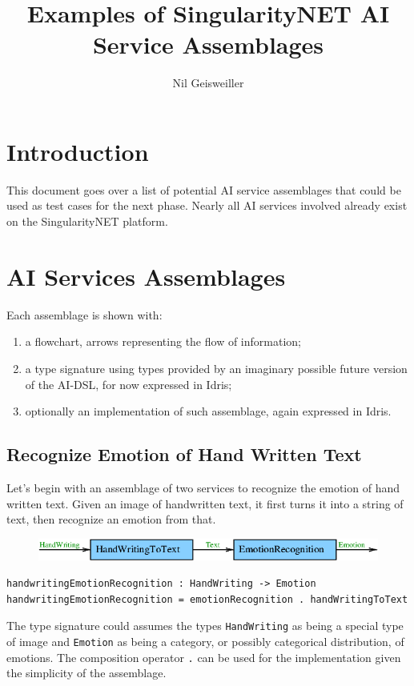 \documentclass[]{article}
\begin{document}
\title{Examples of SingularityNET AI Service Assemblages}
\author{Nil Geisweiller}
\maketitle

\section{Introduction}
This document goes over a list of potential AI service assemblages
that could be used as test cases for the next phase.  Nearly all AI
services involved already exist on the SingularityNET platform.

\section{AI Services Assemblages}
Each assemblage is shown with:
\begin{enumerate}
\item a flowchart, arrows representing the flow of information;
\item a type signature using types provided by an imaginary possible
  future version of the AI-DSL, for now expressed in Idris;
\item optionally an implementation of such assemblage, again expressed
  in Idris.
\end{enumerate}

\subsection{Recognize Emotion of Hand Written Text}
Let's begin with an assemblage of two services to recognize the
emotion of hand written text.  Given an image of handwritten text, it
first turns it into a string of text, then recognize an emotion from
that.
\begin{figure}[H]
  \centering
  \includegraphics[scale=0.55]{figs/HandWritingEmotionRecognition.png}
\end{figure}
\begin{verbatim}
handwritingEmotionRecognition : HandWriting -> Emotion
handwritingEmotionRecognition = emotionRecognition . handWritingToText
\end{verbatim}
The type signature could assumes the types \texttt{HandWriting} as
being a special type of image and \texttt{Emotion} as being a
category, or possibly categorical distribution, of emotions.  The
composition operator \texttt{.} can be used for the implementation
given the simplicity of the assemblage.
\end{document}
